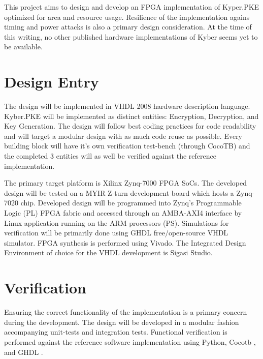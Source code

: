 

This project aims to design and develop an FPGA implementation of Kyper.PKE optimized 
for area and resource usage. Resilience of the implementation agains timing and power
 attacks is also a primary design consideration. At the time of this writing, no other
  published hardware implementations of Kyber seems yet to be available.

  \chapter{Design Entry}
  The design will be implemented in VHDL 2008 hardware description language. Kyber.PKE 
  will be implemented as distinct entities: Encryption, Decryption, and Key Generation.
   The design will follow best coding practices for code readability and will target a 
   modular design with as much code reuse as possible. Every building block will have 
   it’s own verification test-bench (through CocoTB) and the completed 3 entities will 
   as well be verified against the reference implementation.


The primary target platform is Xilinx Zynq-7000 FPGA SoCs. The developed design will be
 tested on a MYIR Z-turn development board which hosts a Zynq-7020 chip. Developed design
  will be programmed into Zynq’s Programmable Logic (PL) FPGA fabric and accessed through 
  an AMBA-AXI4 interface by Linux application running on the ARM processors (PS). 
  Simulations for verification will be primarily done using GHDL free/open-source VHDL
   simulator.  FPGA synthesis is performed using Vivado. The Integrated Design Environment
    of choice for the VHDL development is Sigasi Studio.


\chapter{Verification}
Ensuring the correct functionality of the implementation is a primary concern during the 
development. The design will be developed in a modular fashion accompanying unit-tests 
and integration tests. Functional verification is performed against the reference 
software implementation using Python, Cocotb \cite{cocotb}
 , and GHDL \cite{ghdl}.

